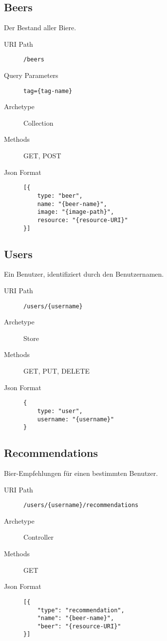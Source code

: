 \documentclass[10pt,a4paper]{scrartcl}
\begin{document}
\subsection{Beers}

Der Bestand aller Biere.

\begin{description}
	\item[URI Path] \texttt{/beers}
 	\item[Query Parameters] \texttt{tag=\{tag-name\}}
	\item[Archetype] Collection
	\item[Methods] GET, POST
	\item[Json Format] \hfill
\begin{lstlisting}
[{
	type: "beer",
	name: "{beer-name}",
	image: "{image-path}",
	resource: "{resource-URI}"
}]
\end{lstlisting}
\end{description}

\subsection{Users}

Ein Benutzer, identifiziert durch den Benutzernamen.

\begin{description}
	\item[URI Path] \texttt{/users/\{username\}}
	\item[Archetype] Store
	\item[Methods] GET, PUT, DELETE
	\item[Json Format] \hfill
\begin{lstlisting}
{
	type: "user",
	username: "{username}"
}
\end{lstlisting}
\end{description}


\subsection{Recommendations}

Bier-Empfehlungen für einen bestimmten Benutzer.

\begin{description}
	\item[URI Path] \texttt{/users/\{username\}/recommendations}
	\item[Archetype] Controller
	\item[Methods] GET
	\item[Json Format] \hfill
\begin{lstlisting}
[{
	"type": "recommendation",
	"name": "{beer-name}",
	"beer": "{resource-URI}"
}]
\end{lstlisting}
\end{description}
\end{document}
